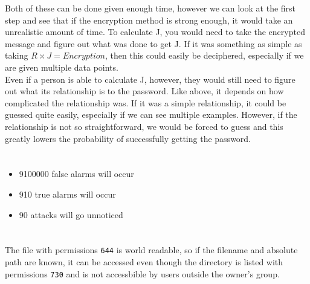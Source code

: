 \documentclass[letterpaper]{article}
\begin{document}
Both of these can be done given enough time, however we can look at the first step and see that if the encryption method is strong enough, it would take an unrealistic amount of time. To calculate J, you would need to take the encrypted message and figure out what was done to get J. If it was something as simple as taking $R \times J = Encryption$, then this could easily be deciphered, especially if we are given multiple data points.
\\
Even if a person is able to calculate J, however, they would still need to figure out what its relationship is to the password. Like above, it depends on how complicated the relationship was. If it was a simple relationship, it could be guessed quite easily, especially if we can see multiple examples. However, if the relationship is not so straightforward, we would be forced to guess and this greatly lowers the probability of successfully getting the password.
\section{}
\begin{itemize}
    \item 9100000 false alarms will occur
    \item 910 true alarms will occur
    \item 90 attacks will go unnoticed
\end{itemize}


\section{}
The file with permissions \texttt{644} is world readable, so if the filename and absolute path are known, it can be accessed even though the directory is listed with permissions \texttt{730} and is not accessbible by users outside the owner's group.



\section{}
\end{document}
